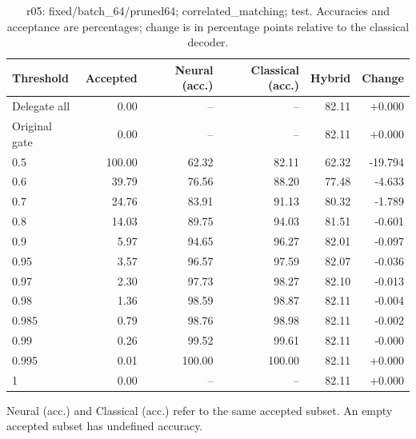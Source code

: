 \begin{table}[htbp]
\centering\small
\setlength{\tabcolsep}{3pt}
\caption{r05: fixed/batch\_64/pruned64; correlated\_matching; test. Accuracies and acceptance are percentages; change is in percentage points relative to the classical decoder.}
\begin{tabular}{lrrrrr}
\toprule
Threshold & Accepted & Neural (acc.) & Classical (acc.) & Hybrid & Change \\
\midrule
Delegate all & 0.00 & -- & -- & 82.11 & +0.000 \\
Original gate & 0.00 & -- & -- & 82.11 & +0.000 \\
0.5 & 100.00 & 62.32 & 82.11 & 62.32 & -19.794 \\
0.6 & 39.79 & 76.56 & 88.20 & 77.48 & -4.633 \\
0.7 & 24.76 & 83.91 & 91.13 & 80.32 & -1.789 \\
0.8 & 14.03 & 89.75 & 94.03 & 81.51 & -0.601 \\
0.9 & 5.97 & 94.65 & 96.27 & 82.01 & -0.097 \\
0.95 & 3.57 & 96.57 & 97.59 & 82.07 & -0.036 \\
0.97 & 2.30 & 97.73 & 98.27 & 82.10 & -0.013 \\
0.98 & 1.36 & 98.59 & 98.87 & 82.11 & -0.004 \\
0.985 & 0.79 & 98.76 & 98.98 & 82.11 & -0.002 \\
0.99 & 0.26 & 99.52 & 99.61 & 82.11 & -0.000 \\
0.995 & 0.01 & 100.00 & 100.00 & 82.11 & +0.000 \\
1 & 0.00 & -- & -- & 82.11 & +0.000 \\
\bottomrule
\end{tabular}
\par\smallskip\footnotesize Neural (acc.) and Classical (acc.) refer to the same accepted subset. An empty accepted subset has undefined accuracy.
\end{table}
